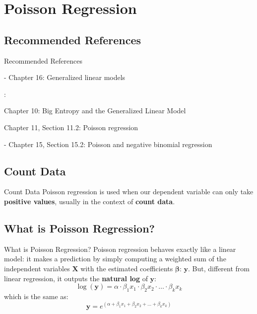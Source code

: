 \section{Poisson Regression}

\subsection{Recommended References}
\begin{frame}{Recommended References}
	\begin{vfilleditems}
		\item \textcite{gelman2013bayesian} - Chapter 16: Generalized linear models
		\item \textcite{mcelreath2020statistical}:
		\begin{vfilleditems}
			\item Chapter 10: Big Entropy and the Generalized Linear Model
			\item Chapter 11, Section 11.2: Poisson regression
		\end{vfilleditems}
		\item \textcite{gelman2020regression} - Chapter 15, Section 15.2: Poisson and negative binomial regression
	\end{vfilleditems}
\end{frame}

\subsection{Count Data}
\begin{frame}{Count Data}
	Poisson regression is used when our dependent variable can only take \textbf{positive values},
	usually in the context of \textbf{count data}.
\end{frame}

\subsection{What is Poisson Regression?}
\begin{frame}{What is Poisson Regression?}
	Poisson regression behaves exactly like a linear model:
	it makes a prediction by simply computing a weighted sum of the
	independent variables $\mathbf{X}$ with the estimated coefficients $\boldsymbol{\beta}$:
	$\boldsymbol{y}$.
	But, different from linear regression,
	it outputs the \textbf{natural log} of $\boldsymbol{y}$:
	$$
		\log(\boldsymbol{y})= \alpha \cdot \beta_1 x_1 \cdot \beta_2 x_2 \cdot \ldots \cdot \beta_k x_k
	$$
	which is the same as:
	$$
		\boldsymbol{y} = e^{(\alpha + \beta_1 x_1 + \beta_2 x_2 + \ldots + \beta_k x_k)}
	$$
\end{frame}

